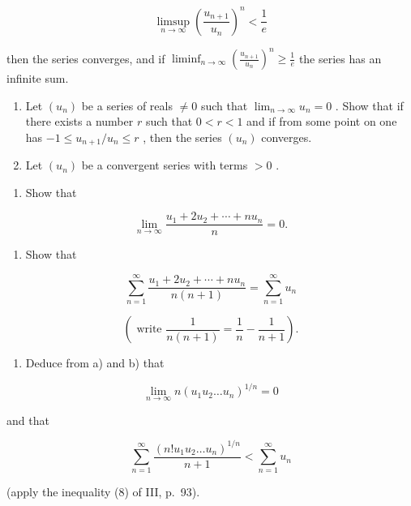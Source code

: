 \[
\operatorname * {l i m s u p} _ {n \to \infty} \left(\frac {u _ {n + 1}}{u _ {n}}\right) ^ {n} <   \frac {1}{e}
\]

then the series converges, and if \(\liminf_{n\to\infty}\left(\frac{u_{n+1}}{u_n}\right)^n\geqslant\frac{1}{e}\) the series has an infinite sum.

\begin{enumerate}
\def\labelenumi{\arabic{enumi})}
\setcounter{enumi}{5}
\item
  Let \((u_{n})\) be a series of reals \(\neq 0\) such that \(\lim_{n\to \infty}u_n = 0\) . Show that if there exists a number \(r\) such that \(0 < r < 1\) and if from some point on one has \(-1\leqslant u_{n + 1} / u_n\leqslant r\) , then the series \((u_{n})\) converges.
\item
  Let \((u_{n})\) be a convergent series with terms \(>0\) .
\end{enumerate}

\begin{enumerate}
\def\labelenumi{\alph{enumi})}
\tightlist
\item
  Show that
\end{enumerate}

\[
\lim _ {n \rightarrow \infty} \frac {u _ {1} + 2 u _ {2} + \cdots + n u _ {n}}{n} = 0.
\]

\begin{enumerate}
\def\labelenumi{\alph{enumi})}
\setcounter{enumi}{1}
\tightlist
\item
  Show that
\end{enumerate}

\[
\sum_ {n = 1} ^ {\infty} \frac {u _ {1} + 2 u _ {2} + \cdots + n u _ {n}}{n (n + 1)} = \sum_ {n = 1} ^ {\infty} u _ {n}
\]

\[
\left(\text { write } \frac {1}{n (n + 1)} = \frac {1}{n} - \frac {1}{n + 1}\right).
\]

\begin{enumerate}
\def\labelenumi{\alph{enumi})}
\setcounter{enumi}{2}
\tightlist
\item
  Deduce from a) and b) that
\end{enumerate}

\[
\lim _ {n \to \infty} n (u _ {1} u _ {2} \dots u _ {n}) ^ {1 / n} = 0
\]

and that

\[
\sum_ {n = 1} ^ {\infty} \frac {(n ! u _ {1} u _ {2} \dots u _ {n}) ^ {1 / n}}{n + 1} <   \sum_ {n = 1} ^ {\infty} u _ {n}
\]

(apply the inequality (8) of III, p.~93).

